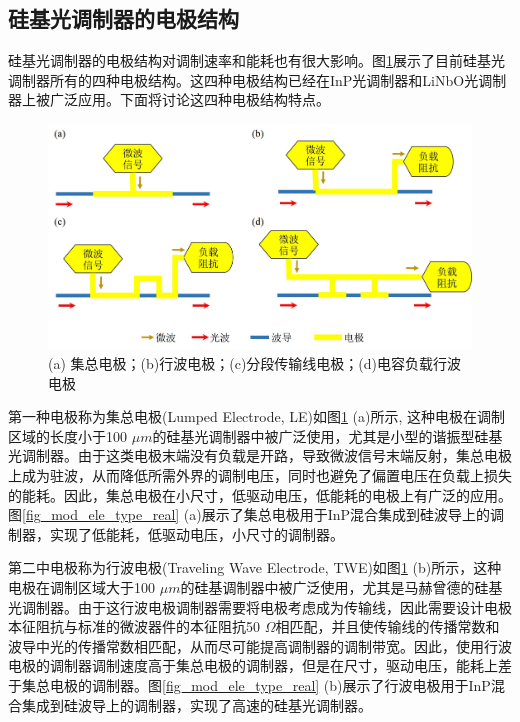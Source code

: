 \subsection{硅基光调制器的电极结构}
硅基光调制器的电极结构对调制速率和能耗也有很大影响。图\ref{fig_mod_ele_type}展示了目前硅基光调制器所有的四种电极结构。这四种电极结构已经在InP光调制器和LiNbO光调制器上被广泛应用。下面将讨论这四种电极结构特点。

\begin{figure}[htb]
	\centering
	\includegraphics[width=12cm]{./Pictures/fig_mod_ele_type.jpg}
	\caption{ (a) 集总电极；(b)行波电极；(c)分段传输线电极；(d)电容负载行波电极}
	\label{fig_mod_ele_type}
\end{figure}

第一种电极称为集总电极(Lumped Electrode, LE)如图\ref{fig_mod_ele_type} (a)所示, 这种电极在调制区域的长度小于100 $\mu m$的硅基光调制器中被广泛使用，尤其是小型的谐振型硅基光调制器。由于这类电极末端没有负载是开路，导致微波信号末端反射，集总电极上成为驻波，从而降低所需外界的调制电压，同时也避免了偏置电压在负载上损失的能耗。因此，集总电极在小尺寸，低驱动电压，低能耗的电极上有广泛的应用。图\ref{fig_mod_ele_type_real} (a)展示了集总电极用于InP混合集成到硅波导上的调制器\cite{tang2012energy}，实现了低能耗，低驱动电压，小尺寸的调制器。

第二中电极称为行波电极(Traveling Wave Electrode, TWE)如图\ref{fig_mod_ele_type} (b)所示，这种电极在调制区域大于100 $\mu m$的硅基调制器中被广泛使用，尤其是马赫曾德的硅基光调制器。由于这行波电极调制器需要将电极考虑成为传输线，因此需要设计电极本征阻抗与标准的微波器件的本征阻抗50 $\Omega$相匹配，并且使传输线的传播常数和波导中光的传播常数相匹配，从而尽可能提高调制器的调制带宽。因此，使用行波电极的调制器调制速度高于集总电极的调制器，但是在尺寸，驱动电压，能耗上差于集总电极的调制器。图\ref{fig_mod_ele_type_real} (b)展示了行波电极用于InP混合集成到硅波导上的调制器\cite{tang2012energy}，实现了高速的硅基光调制器。

